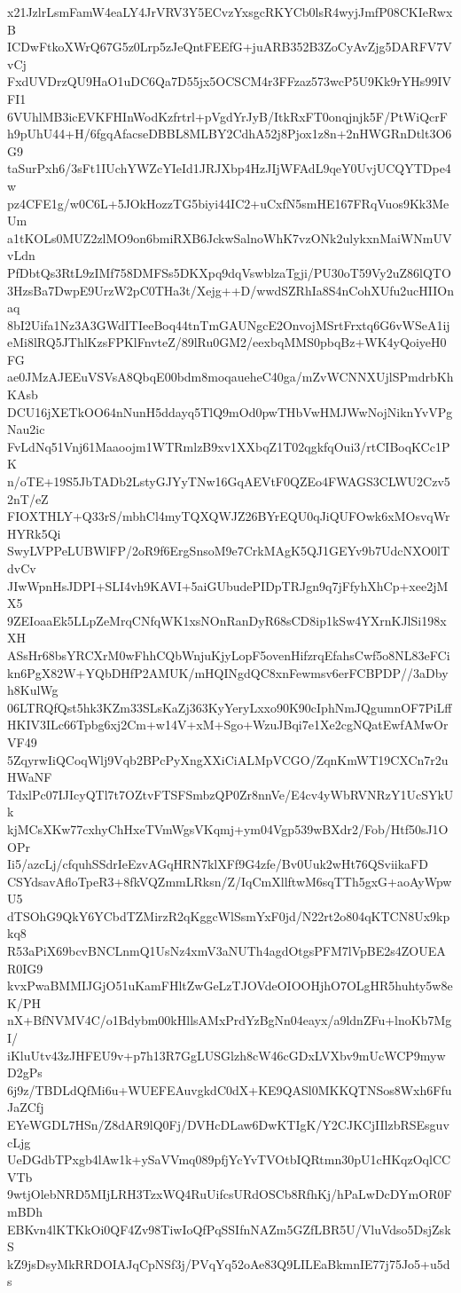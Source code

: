 x21JzlrLsmFamW4eaLY4JrVRV3Y5ECvzYxsgcRKYCb0lsR4wyjJmfP08CKIeRwxB
ICDwFtkoXWrQ67G5z0Lrp5zJeQntFEEfG+juARB352B3ZoCyAvZjg5DARFV7VvCj
FxdUVDrzQU9HaO1uDC6Qa7D55jx5OCSCM4r3FFzaz573wcP5U9Kk9rYHs99IVFI1
6VUhlMB3icEVKFHInWodKzfrtrl+pVgdYrJyB/ItkRxFT0onqjnjk5F/PtWiQcrF
h9pUhU44+H/6fgqAfacseDBBL8MLBY2CdhA52j8Pjox1z8n+2nHWGRnDtlt3O6G9
taSurPxh6/3sFt1IUchYWZcYIeId1JRJXbp4HzJIjWFAdL9qeY0UvjUCQYTDpe4w
pz4CFE1g/w0C6L+5JOkHozzTG5biyi44IC2+uCxfN5smHE167FRqVuos9Kk3MeUm
a1tKOLs0MUZ2zlMO9on6bmiRXB6JckwSalnoWhK7vzONk2ulykxnMaiWNmUVvLdn
PfDbtQs3RtL9zIMf758DMFSs5DKXpq9dqVswblzaTgji/PU30oT59Vy2uZ86lQTO
3HzsBa7DwpE9UrzW2pC0THa3t/Xejg++D/wwdSZRhIa8S4nCohXUfu2ucHIIOnaq
8bI2Uifa1Nz3A3GWdITIeeBoq44tnTmGAUNgcE2OnvojMSrtFrxtq6G6vWSeA1ij
eMi8lRQ5JThlKzsFPKlFnvteZ/89lRu0GM2/eexbqMMS0pbqBz+WK4yQoiyeH0FG
ae0JMzAJEEuVSVsA8QbqE00bdm8moqaueheC40ga/mZvWCNNXUjlSPmdrbKhKAsb
DCU16jXETkOO64nNunH5ddayq5TlQ9mOd0pwTHbVwHMJWwNojNiknYvVPgNau2ic
FvLdNq51Vnj61Maaoojm1WTRmlzB9xv1XXbqZ1T02qgkfqOui3/rtCIBoqKCc1PK
n/oTE+19S5JbTADb2LstyGJYyTNw16GqAEVtF0QZEo4FWAGS3CLWU2Czv52nT/eZ
FIOXTHLY+Q33rS/mbhCl4myTQXQWJZ26BYrEQU0qJiQUFOwk6xMOsvqWrHYRk5Qi
SwyLVPPeLUBWlFP/2oR9f6ErgSnsoM9e7CrkMAgK5QJ1GEYv9b7UdcNXO0lTdvCv
JIwWpnHsJDPI+SLI4vh9KAVI+5aiGUbudePIDpTRJgn9q7jFfyhXhCp+xee2jMX5
9ZEIoaaEk5LLpZeMrqCNfqWK1xsNOnRanDyR68sCD8ip1kSw4YXrnKJlSi198xXH
ASsHr68bsYRCXrM0wFhhCQbWnjuKjyLopF5ovenHifzrqEfahsCwf5o8NL83eFCi
kn6PgX82W+YQbDHfP2AMUK/mHQINgdQC8xnFewmsv6erFCBPDP//3aDbyh8KulWg
06LTRQfQst5hk3KZm33SLsKaZj363KyYeryLxxo90K90cIphNmJQgumnOF7PiLff
HKIV3ILc66Tpbg6xj2Cm+w14V+xM+Sgo+WzuJBqi7e1Xe2cgNQatEwfAMwOrVF49
5ZqyrwIiQCoqWlj9Vqb2BPcPyXngXXiCiALMpVCGO/ZqnKmWT19CXCn7r2uHWaNF
TdxlPc07IJIcyQTl7t7OZtvFTSFSmbzQP0Zr8nnVe/E4cv4yWbRVNRzY1UcSYkUk
kjMCsXKw77cxhyChHxeTVmWgsVKqmj+ym04Vgp539wBXdr2/Fob/Htf50sJ1OOPr
Ii5/azcLj/cfquhSSdrIeEzvAGqHRN7klXFf9G4zfe/Bv0Uuk2wHt76QSviikaFD
CSYdsavAfloTpeR3+8fkVQZmmLRksn/Z/IqCmXllftwM6sqTTh5gxG+aoAyWpwU5
dTSOhG9QkY6YCbdTZMirzR2qKggcWlSsmYxF0jd/N22rt2o804qKTCN8Ux9kpkq8
R53aPiX69bcvBNCLnmQ1UsNz4xmV3aNUTh4agdOtgsPFM7lVpBE2s4ZOUEAR0IG9
kvxPwaBMMIJGjO51uKamFHltZwGeLzTJOVdeOIOOHjhO7OLgHR5huhty5w8eK/PH
nX+BfNVMV4C/o1Bdybm00kHllsAMxPrdYzBgNn04eayx/a9ldnZFu+lnoKb7MgI/
iKluUtv43zJHFEU9v+p7h13R7GgLUSGlzh8cW46cGDxLVXbv9mUcWCP9mywD2gPs
6j9z/TBDLdQfMi6u+WUEFEAuvgkdC0dX+KE9QASl0MKKQTNSos8Wxh6FfuJaZCfj
EYeWGDL7HSn/Z8dAR9lQ0Fj/DVHcDLaw6DwKTIgK/Y2CJKCjIIlzbRSEsguvcLjg
UeDGdbTPxgb4lAw1k+ySaVVmq089pfjYcYvTVOtbIQRtmn30pU1cHKqzOqlCCVTb
9wtjOlebNRD5MIjLRH3TzxWQ4RuUifcsURdOSCb8RfhKj/hPaLwDcDYmOR0FmBDh
EBKvn4lKTKkOi0QF4Zv98TiwIoQfPqSSIfnNAZm5GZfLBR5U/VluVdso5DsjZskS
kZ9jsDsyMkRRDOIAJqCpNSf3j/PVqYq52oAe83Q9LILEaBkmnIE77j75Jo5+u5ds
